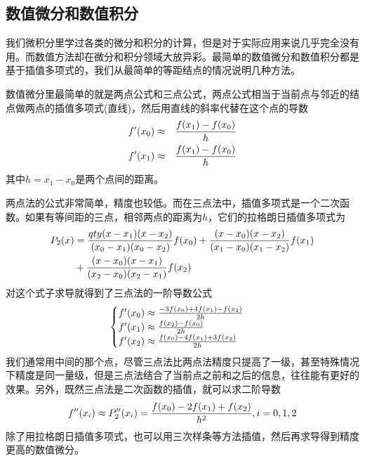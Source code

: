 \documentclass[12pt,a4paper,openany,twoside]{book}
\numberwithin{equation}{section}
\begin{document}
    \subsection{数值微分和数值积分}
      \label{numerical_differential_integral}
      我们微积分里学过各类的微分和积分的计算，但是对于实际应用来说几乎完全没有用。而数值方法却在微分和积分领域大放异彩。最简单的数值微分和数值积分都是基于插值多项式的，我们从最简单的等距结点的情况说明几种方法。

      数值微分里最简单的就是两点公式和三点公式，两点公式相当于当前点与邻近的结点做两点的插值多项式(直线)，然后用直线的斜率代替在这个点的导数
      \begin{equation}
        \begin{aligned}
          f'\qty(x_0)&\approx&\frac{f\qty(x_1)-f\qty(x_0)}{h}\\
          f'\qty(x_1)&\approx&\frac{f\qty(x_1)-f\qty(x_0)}{h}
        \end{aligned}
      \end{equation}
      其中$h=x_1-x_0$是两个点间的距离。
      
      两点法的公式非常简单，精度也较低。而在三点法中，插值多项式是一个二次函数。如果有等间距的三点，相邻两点的距离为$h$，它们的拉格朗日插值多项式为
      \begin{equation*}
        \begin{aligned}
          P_2\qty(x)&=\frac{qty(x-x_1)\qty(x-x_2)}{\qty(x_0-x_1)\qty(x_0-x_2)}f\qty(x_0)+\frac{\qty(x-x_0)\qty(x-x_2)}{\qty(x_1-x_0)\qty(x_1-x_2)}f\qty(x_1) \\
          &+\frac{\qty(x-x_0)\qty(x-x_1)}{\qty(x_2-x_0)\qty(x_2-x_1)}f\qty(x_2)
        \end{aligned}
      \end{equation*}
      对这个式子求导就得到了三点法的一阶导数公式
      \begin{equation}
        \begin{cases}
          f'\qty(x_0)\approx\frac{-3f\qty(x_0)+4f\qty(x_1)-f\qty(x_2)}{2h} \\
          f'\qty(x_1)\approx\frac{f\qty(x_2)-f\qty(x_0)}{2h} \\
          f'\qty(x_2)\approx\frac{f\qty(x_0)-4f\qty(x_1)+3f\qty(x_2)}{2h}
        \end{cases}
      \end{equation}
      我们通常用中间的那个点，尽管三点法比两点法精度只提高了一级，甚至特殊情况下精度是同一量级，但是三点法结合了当前点之前和之后的信息，往往能有更好的效果。另外，既然三点法是二次函数的插值，就可以求二阶导数
      \begin{equation}
        f''\qty(x_i)\approx P''_2\qty(x_i)=\frac{f\qty(x_0)-2f\qty(x_1)+f\qty(x_2)}{h^2}, i=0,1,2
      \end{equation}
      除了用拉格朗日插值多项式，也可以用三次样条等方法插值，然后再求导得到精度更高的数值微分。
\end{document}

